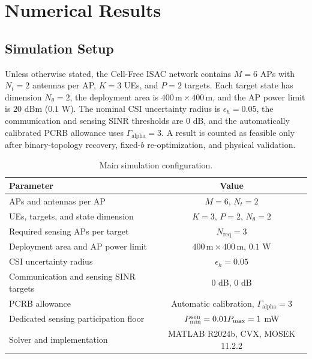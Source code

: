 \section{Numerical Results}\label{sec:numerical}

\subsection{Simulation Setup}
Unless otherwise stated, the Cell-Free ISAC network contains $M=6$ APs with
$N_t=2$ antennas per AP, $K=3$ UEs, and $P=2$ targets. Each target state has
dimension $N_\theta=2$, the deployment area is $400\,\mathrm{m}\times
400\,\mathrm{m}$, and the AP power limit is $20$ dBm ($0.1$ W). The nominal
CSI uncertainty radius is $\epsilon_h=0.05$, the communication and sensing
SINR thresholds are $0$ dB, and the automatically calibrated PCRB allowance
uses $\Gamma_{\mathrm{alpha}}=3$. A result is counted as feasible only after
binary-topology recovery, fixed-$b$ re-optimization, and physical validation.

\begin{table}[htbp]
\centering
\caption{Main simulation configuration.}
\label{tab:simulation-setup}
\begin{tabular}{lc}
\toprule
Parameter & Value\\
\midrule
APs and antennas per AP & $M=6$, $N_t=2$\\
UEs, targets, and state dimension & $K=3$, $P=2$, $N_\theta=2$\\
Required sensing APs per target & $N_{\mathrm{req}}=3$\\
Deployment area and AP power limit & $400\,\mathrm{m}\times400\,\mathrm{m}$, $0.1$ W\\
CSI uncertainty radius & $\epsilon_h=0.05$\\
Communication and sensing SINR targets & $0$ dB, $0$ dB\\
PCRB allowance & Automatic calibration, $\Gamma_{\mathrm{alpha}}=3$\\
Dedicated sensing participation floor & $P_{\min}^{\rm sen}=0.01P_{\max}=1$ mW\\
Solver and implementation & MATLAB R2024b, CVX, MOSEK 11.2.2\\
\bottomrule
\end{tabular}
\end{table}

